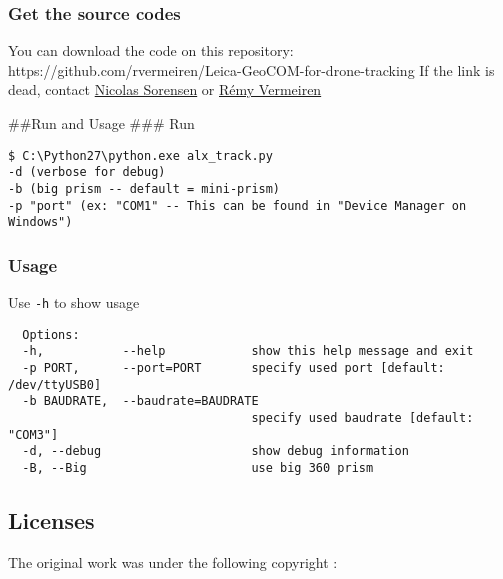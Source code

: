 \hypertarget{get-the-source-codes}{%
\subsubsection{Get the source codes}\label{get-the-source-codes}}

You can download the code on this repository:
https://github.com/rvermeiren/Leica-GeoCOM-for-drone-tracking If the
link is dead, contact \href{https://github.com/nicolassorensen/}{Nicolas
Sorensen} or \href{https://github.com/rvermeiren/}{Rémy Vermeiren}

\#\#Run and Usage \#\#\# Run

\begin{verbatim}
$ C:\Python27\python.exe alx_track.py
-d (verbose for debug)
-b (big prism -- default = mini-prism)
-p "port" (ex: "COM1" -- This can be found in "Device Manager on Windows")
\end{verbatim}

\hypertarget{usage}{%
\subsubsection{Usage}\label{usage}}

Use \texttt{-h} to show usage

\begin{verbatim}
  Options:
  -h,           --help            show this help message and exit
  -p PORT,      --port=PORT       specify used port [default: /dev/ttyUSB0]
  -b BAUDRATE,  --baudrate=BAUDRATE
                                  specify used baudrate [default: "COM3"]
  -d, --debug                     show debug information
  -B, --Big                       use big 360 prism
\end{verbatim}

\hypertarget{licenses}{%
\subsection{Licenses}\label{licenses}}

The original work was under the following copyright :

